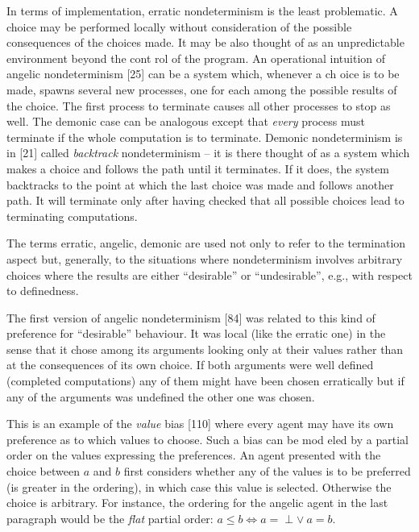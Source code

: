 \documentclass[10pt]{article}
\renewcommand{\iff}{\mathrel{\Leftrightarrow}}
\begin{document}
 
In terms of implementation, erratic nondeterminism is the least 
problematic. A choice may be performed locally without consideration 
of the possible consequences of the choices made. It may be also 
thought of as an unpredictable environment beyond the cont
rol of the program. An operational intuition of angelic 
nondeterminism [25] can be a system which, whenever a ch
oice is to be made, spawns several new processes, one for each among 
the possible results of the choice. The first process to terminate 
causes all other processes to stop as well. The demonic case can be 
analogous except that {\em every}
 process must terminate if the whole computation is to terminate. 
Demonic nondeterminism is in [21] called {\em backtrack} 
nondeterminism  -- 
it is there thought of as a system which makes a choice and follows 
the path until it terminates. If it does, the system backtracks to 
the point at
 which the last choice was made and follows another path. It will 
terminate only after having checked that all possible choices lead to 
terminating computations.

 The terms erratic, angelic, demonic are used 
not only to refer to the termination aspect but, generally, to the 
situations where nondeterminism involves arbitrary choices where the 
results are either ``desirable'' 
 or ``undesirable'',  e.g., with respect to 
definedness. 

 The first version of angelic nondeterminism 
[84] was related to this kind of preference for ``desirable'' 
 behaviour. It was local (like the erratic one) in the sense that it 
chose among its arguments looking only at their values rather than at 
the consequences of its own choice. If both arguments were well 
defined (completed computations) any of them might have been chosen 
erratically but if any of the 
arguments was undefined the other one was chosen. 

 This is an example of the {\em value} bias 
[110] where every agent may have its own preference as to which 
values to choose. Such a bias can be mod
eled by a partial order on the values expressing the preferences. An 
agent presented with the choice between $a$ and $b$
 first considers whether any of the values is to be preferred (is 
greater in the ordering), in which case this value is selected. 
Otherwise the choice is arbitrary. For instance, the ordering for the 
angelic agent in the last paragraph would be the {\em 
flat} partial order: $a\leq  b \iff a=\perp \lor\ a=b$.
\end{document}
